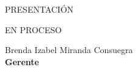 \begin{center}
{\Bold \LARGE \color{color3} PRESENTACIÓN}\\[2cm]
\end{center}
EN PROCESO
\begin{center}
Brenda Izabel Miranda Consuegra\\
\textbf{Gerente}
\end{center}

